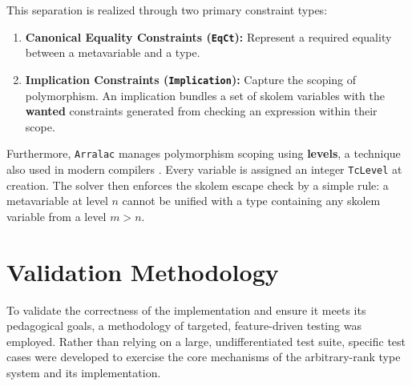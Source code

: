 \newpage
This separation is realized through two primary constraint types:
\begin{enumerate}
    \item \textbf{Canonical Equality Constraints (\texttt{EqCt}):} Represent a required equality between a metavariable and a type.
    \item \textbf{Implication Constraints (\texttt{Implication}):} Capture the scoping of polymorphism. An implication bundles a set of skolem variables with the \textbf{wanted} \cite{wits-type-inference-using-constraints} constraints generated from checking an expression within their scope.
\end{enumerate}

Furthermore, \texttt{Arralac} manages polymorphism scoping using \textbf{levels}, a technique also used in modern compilers \cite{practical-type-inference-with-levels-2025}. Every variable is assigned an integer \texttt{TcLevel} at creation. The solver then enforces the skolem escape check by a simple rule: a metavariable at level $n$ cannot be unified with a type containing any skolem variable from a level $m > n$.

\section{Validation Methodology}
\label{sec:Implementation:Methodology}

To validate the correctness of the implementation and ensure it meets its pedagogical goals, a methodology of targeted, feature-driven testing was employed. Rather than relying on a large, undifferentiated test suite, specific test cases were developed to exercise the core mechanisms of the arbitrary-rank type system and its implementation.

